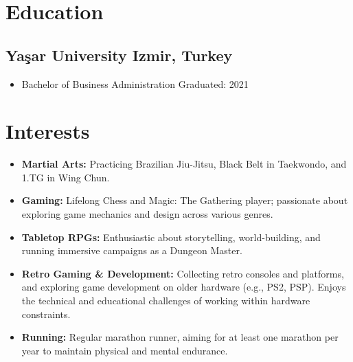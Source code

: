 \documentclass[11pt]{article}
\newcommand{\rside}[1]{
  \hfill {\normalfont\color{accent} #1}%
}
\begin{document}
\section{Education}
\subsection{Yaşar University \rside{Izmir, Turkey}}
\begin{itemize}
    \item{Bachelor of Business Administration \rside{Graduated: 2021}}
\end{itemize}
\section{Interests}
\begin{itemize}
    \item \textbf{Martial Arts:} Practicing Brazilian Jiu-Jitsu, Black Belt in Taekwondo, and 1.TG in Wing Chun.
    \item \textbf{Gaming:} Lifelong Chess and Magic: The Gathering player; passionate about exploring game mechanics and design across various genres.
    \item \textbf{Tabletop RPGs:} Enthusiastic about storytelling, world-building, and running immersive campaigns as a Dungeon Master.
    \item \textbf{Retro Gaming \& Development:} Collecting retro consoles and platforms, and exploring game development on older hardware (e.g., PS2, PSP). Enjoys the technical and educational challenges of working within hardware constraints.
    \item \textbf{Running:} Regular marathon runner, aiming for at least one marathon per year to maintain physical and mental endurance.
\end{itemize}
\end{document}
